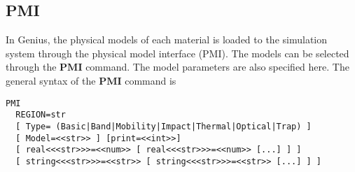 \documentclass[oneside,12pt]{cgd_book}
\begin{document}
\subsection{PMI}
In Genius, the physical models of each material is loaded to the simulation system through the
        physical model interface (PMI). The models can be selected through the
$\mathbf{PMI}$ command. The model
        parameters are also specified here. The general syntax of the
$\mathbf{PMI}$ command is
\par
\begin{lstlisting}[style=GeniusCmd]
PMI
  REGION=str
  [ Type= (Basic|Band|Mobility|Impact|Thermal|Optical|Trap) ]
  [ Model=<<str>> ] [print=<<int>>]
  [ real<<<str>>>=<<num>> [ real<<<str>>>=<<num>> [...] ] ]
  [ string<<<str>>>=<<str>> [ string<<<str>>>=<<str>> [...] ] ]
\end{lstlisting}
\end{document}
